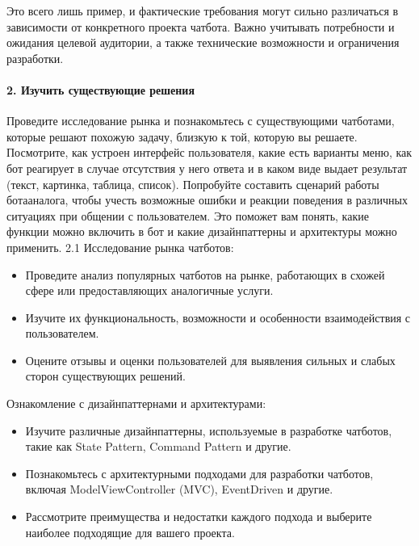 \documentclass[letterpaper,10pt,russian]{sphinxmanual}
\begin{document}
\sphinxAtStartPar
Это всего лишь пример, и фактические требования могут сильно различаться в зависимости от конкретного проекта чат\sphinxhyphen{}бота. Важно учитывать потребности и ожидания целевой аудитории, а также технические возможности и ограничения разработки.


\paragraph{2. Изучить существующие решения}
\label{\detokenize{educational_materials/uml/content:id11}}
\sphinxAtStartPar
Проведите исследование рынка и познакомьтесь с существующими чат\sphinxhyphen{}ботами, которые решают похожую задачу, близкую к той, которую вы решаете. Посмотрите, как устроен интерфейс пользователя, какие есть варианты меню, как бот реагирует в случае отсутствия у него ответа и в каком виде выдает результат (текст, картинка, таблица, список). Попробуйте составить сценарий работы бота\sphinxhyphen{}аналога, чтобы учесть возможные ошибки и реакции поведения в различных ситуациях при общении с пользователем. Это поможет вам понять, какие функции можно включить в бот и какие дизайн\sphinxhyphen{}паттерны и архитектуры можно применить.
2.1 Исследование рынка чат\sphinxhyphen{}ботов:
\begin{itemize}
\item {} 
\sphinxAtStartPar
Проведите анализ популярных чат\sphinxhyphen{}ботов на рынке, работающих в схожей сфере или предоставляющих аналогичные услуги.

\item {} 
\sphinxAtStartPar
Изучите их функциональность, возможности и особенности взаимодействия с пользователем.

\item {} 
\sphinxAtStartPar
Оцените отзывы и оценки пользователей для выявления сильных и слабых сторон существующих решений.

\end{itemize}

 Ознакомление с дизайн\sphinxhyphen{}паттернами и архитектурами:
\begin{itemize}
\item {} 
\sphinxAtStartPar
Изучите различные дизайн\sphinxhyphen{}паттерны, используемые в разработке чат\sphinxhyphen{}ботов, такие как State Pattern, Command Pattern и другие.

\item {} 
\sphinxAtStartPar
Познакомьтесь с архитектурными подходами для разработки чат\sphinxhyphen{}ботов, включая Model\sphinxhyphen{}View\sphinxhyphen{}Controller (MVC), Event\sphinxhyphen{}Driven и другие.

\item {} 
\sphinxAtStartPar
Рассмотрите преимущества и недостатки каждого подхода и выберите наиболее подходящие для вашего проекта.

\end{itemize}
\end{document}
